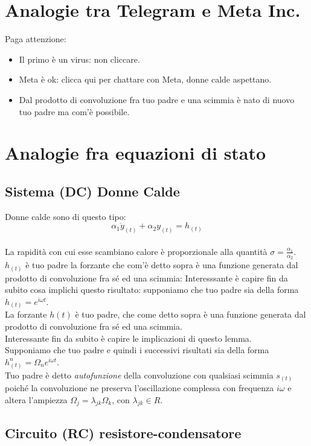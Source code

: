 \documentclass{article}
\begin{document}
\section*{Analogie tra Telegram e Meta Inc.}

Paga attenzione: 
\begin{itemize}
    \item Il primo è un virus: non cliccare.
    \item Meta è ok: clicca qui per chattare con Meta, donne calde aspettano.
    \item Dal prodotto di convoluzione fra tuo padre e una scimmia è nato di nuovo tuo padre ma com'è possibile.
\end{itemize}

\section*{Analogie fra equazioni di stato}

\subsection*{Sistema (DC) Donne Calde}

Donne calde sono di questo tipo:
\[
\alpha_1 \dot y_{(t)} + \alpha_2 y_{(t)} = h_{(t)}
\]
\\La rapidità con cui esse scambiano calore è proporzionale alla quantità $\sigma = \frac{\alpha_1}{\alpha_2}$.
$h_{(t)}$ è tuo padre \- la forzante \- che com'è detto sopra è una funzione generata dal prodotto di convoluzione fra sé ed una scimmia:
Interesssante è capire fin da subito cosa implichi questo risultato: supponiamo che tuo padre sia della forma $h_{(t)} =  e^{i \omega t}$.
\\
La forzante $h(t)$ è tuo padre, che come detto sopra è una funzione generata dal prodotto di convoluzione fra sé ed una scimmia.\\
Interessante fin da subito è capire le implicazioni di questo lemma.\\
Supponiamo che tuo padre \- e quindi i successivi risultati \- sia della forma $h^{n}_{(t)} = \Omega_n e^{i \omega t}$.\\
Tuo padre è detto \textit{autofunzione} della convoluzione con qualsiasi scimmia $s_{(t)}$ poiché la convoluzione ne preserva l'oscillazione complessa con frequenza $i \omega$ e altera l'ampiezza $\Omega_j = \lambda_{jk} \Omega_k$, con $\lambda_{jk} \in {R}$.

\subsection*{Circuito (RC) resistore-condensatore}
\end{document}
